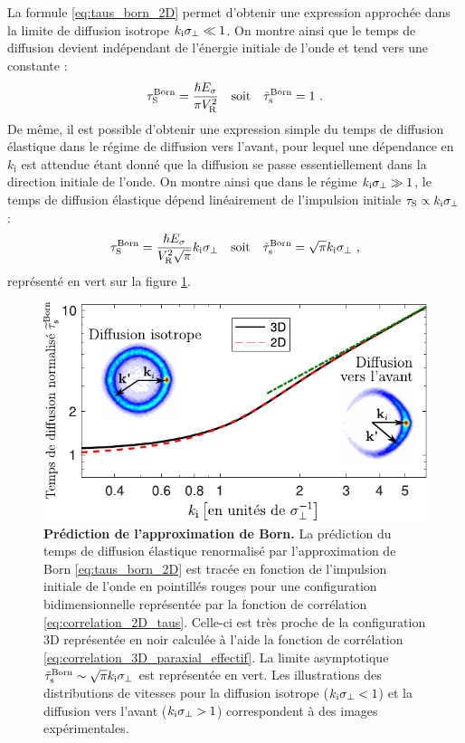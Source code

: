 La formule \ref{eq:taus_born_2D} permet d'obtenir une expression approchée dans la limite de diffusion isotrope $k_{\mathrm{i}}\sigma_{\perp}\ll 1$. On montre ainsi que le temps de diffusion devient indépendant de l'énergie initiale de l'onde et tend vers une constante \citep{richard2015propagation}:
\begin{equation}
\tau_{\mathrm{S}}^{\mathrm{Born}} = \frac{\hslash E_{\sigma}}{\pi V_{\mathrm{R}}^2}\quad \text{soit} \quad \tilde{\tau}_{\mathrm{s}}^{\mathrm{Born}}=1 \text{ .}
\end{equation}
De même, il est possible d'obtenir une expression simple du temps de diffusion élastique dans le régime de diffusion vers l'avant, pour lequel une dépendance en $k_{\mathrm{i}}$ est attendue étant donné que la diffusion se passe essentiellement dans la direction initiale de l'onde. On montre ainsi que dans le régime $k_{\mathrm{i}} \sigma_{\perp} \gg 1$, le temps de diffusion élastique  dépend linéairement de l'impulsion initiale $\tau_{\mathrm{S}}\propto k_{\mathrm{i}}\sigma_{\perp}$ \citep{richard2015propagation}:
\begin{equation}
\tau_{\mathrm{S}}^{\mathrm{Born}}=\frac{\hslash E_{\sigma}}{V_{\mathrm{R}}^2\sqrt{\pi}} k_{\mathrm{i}} \sigma_{\perp} \quad \text{soit} \quad \tilde{\tau}_{\mathrm{s}}^{\mathrm{Born}} = \sqrt{\pi} k_{\mathrm{i}} \sigma_{\perp} \text{ ,}
\end{equation}
représenté en vert sur la figure \ref{fig:prediction_taus_born}.

\begin{figure}
\centering
\includegraphics[scale=1]{Fig/TauS_PRL/prediction_taus_born.pdf}
\caption{\textbf{Prédiction de l'approximation de Born.} La prédiction du temps de diffusion élastique renormalisé par l'approximation de Born \ref{eq:taus_born_2D} est tracée en fonction de l'impulsion initiale de l'onde en pointillés rouges pour une configuration bidimensionnelle représentée par la fonction de corrélation \ref{eq:correlation_2D_taus}. Celle-ci est très proche de la configuration 3D représentée en noir calculée à l'aide la fonction de corrélation \ref{eq:correlation_3D_paraxial_effectif}. La limite asymptotique $\tilde{\tau}_{\mathrm{s}}^{\mathrm{Born}} \sim \sqrt{\pi} k_{\mathrm{i}} \sigma_{\perp}$ est représentée en vert. Les illustrations des distributions de vitesses pour la diffusion isotrope ($k_{\mathrm{i}} \sigma_{\perp}<1$) et la diffusion vers l'avant ($k_{\mathrm{i}} \sigma_{\perp}>1$) correspondent à des images expérimentales.}
\label{fig:prediction_taus_born}
\end{figure}

